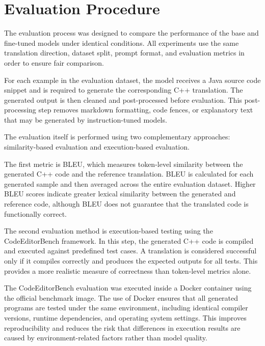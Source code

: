 \section{Evaluation Procedure}

The evaluation process was designed to compare the performance of the base and
fine-tuned models under identical conditions. All experiments use the same
translation direction, dataset split, prompt format, and evaluation metrics in
order to ensure fair comparison.

For each example in the evaluation dataset, the model receives a Java source
code snippet and is required to generate the corresponding C++ translation. The
generated output is then cleaned and post-processed before evaluation. This
post-processing step removes markdown formatting, code fences, or explanatory
text that may be generated by instruction-tuned models.

The evaluation itself is performed using two complementary approaches:
similarity-based evaluation and execution-based evaluation.

The first metric is BLEU, which measures token-level similarity between the
generated C++ code and the reference translation. BLEU is calculated for each
generated sample and then averaged across the entire evaluation dataset. Higher
BLEU scores indicate greater lexical similarity between the generated and
reference code, although BLEU does not guarantee that the translated code is
functionally correct.

The second evaluation method is execution-based testing using the
CodeEditorBench framework. In this step, the generated C++ code is compiled and
executed against predefined test cases. A translation is considered successful
only if it compiles correctly and produces the expected outputs for all tests.
This provides a more realistic measure of correctness than token-level metrics
alone.

The CodeEditorBench evaluation was executed inside a Docker container using the %
official benchmark image. The use of Docker ensures that all generated programs
are tested under the same environment, including identical compiler versions,
runtime dependencies, and operating system settings. This improves
reproducibility and reduces the risk that differences in execution results are
caused by environment-related factors rather than model quality.

